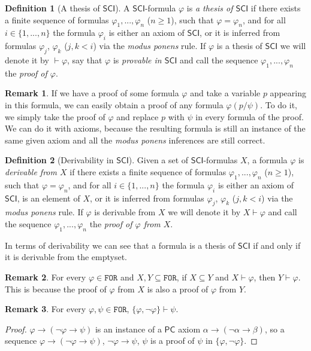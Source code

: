 \documentclass{article}
\theoremstyle{definition}
\newtheorem{definition}{Definition}[section]
\theoremstyle{definition}
\theoremstyle{definition}
\newtheorem{remark}{Remark}[section]
\newcommand*{\ra}{\rightarrow}
\newcommand*{\FOR}{\texttt{FOR}}
\newcommand{\SCI}{$\mathsf{SCI}$\xspace}
\newcommand{\PC}{$\mathsf{PC}$\xspace}
\begin{document}
\begin{definition}[A thesis of \SCI]
    A \SCI-formula $\varphi$ is \emph{a thesis of \SCI} if there exists a finite sequence of formulas $\varphi_1, ..., \varphi_n$ ($n \geq 1$), such that $\varphi = \varphi_n$, and for all $i \in \{1, ..., n\}$ the formula $\varphi_i$ is either an axiom of \SCI, or it is inferred from formulas $\varphi_j$, $\varphi_k$ ($j, k <i$) via the \emph{modus ponens} rule. If $\varphi$ is a thesis of \SCI we will denote it by $\vdash \varphi$, say that $\varphi$ is \emph{provable in \SCI} and call the sequence $\varphi_1, ..., \varphi_n$ the \emph{proof of $\varphi$}.
    \label{thesis}
\end{definition}
%
\begin{remark}
    \label{remark_proof_varphi}
    If we have a proof of some formula $\varphi$ and take a variable $p$ appearing in this formula, we can easily obtain a proof of any formula $\varphi(p/\psi)$. To do it, we simply take the proof of $\varphi$ and replace $p$ with $\psi$ in every formula of the proof. We can do it with axioms, because the resulting formula is still an instance of the same given axiom and all the \emph{modus ponens} inferences are still correct.
\end{remark}
%
\begin{definition}[Derivability in \SCI]
    Given a set of \SCI-formulas $X$, a formula $\varphi$ is \emph{derivable from $X$} if there exists a finite sequence of formulas $\varphi_1, ..., \varphi_n$ ($n \geq 1$), such that $\varphi = \varphi_n$, and for all $i \in \{1, ..., n\}$ the formula $\varphi_i$ is either an axiom of \SCI, is an element of $X$, or it is inferred from formulas $\varphi_j$, $\varphi_k$ ($j, k <i$) via the \emph{modus ponens} rule. If $\varphi$ is derivable from $X$ we will denote it by $X \vdash \varphi$ and call the sequence $\varphi_1, ..., \varphi_n$ the \emph{proof of $\varphi$ from $X$}.
\end{definition}
%
In terms of derivability we can see that a formula is a thesis of \SCI if and
only if it is derivable from the emptyset.

\begin{remark} For every $\varphi \in \FOR$ and $X, Y \subseteq \FOR$, if $X \subseteq Y$ and $X \vdash \varphi$, then $Y \vdash \varphi$. This is because the proof of $\varphi$ from $X$ is also a proof of $\varphi$ from $Y$.
\end{remark}

\begin{remark} For every $\varphi, \psi \in \FOR$, $\{\varphi, \lnot \varphi\} \vdash \psi$.
    \label{falsehood_proves_all}
    \begin{proof} $\varphi \ra (\lnot \varphi \ra \psi)$ is an instance of a \PC axiom $\alpha \ra (\lnot \alpha \ra \beta)$, so a sequence $\varphi \ra (\lnot \varphi \ra \psi)$, $\lnot \varphi \ra \psi$, $\psi$ is a proof of $\psi$ in $\{\varphi, \lnot \varphi\}$.
    \end{proof}
\end{remark}
\end{document}
